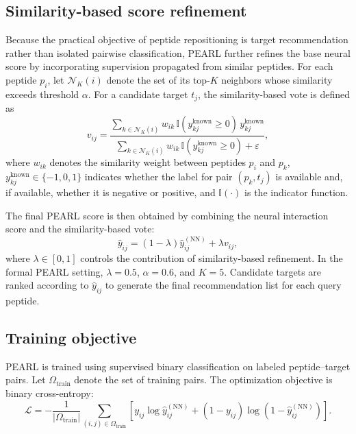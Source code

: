 \subsection{Similarity-based score refinement}

Because the practical objective of peptide repositioning is target recommendation rather than isolated pairwise classification, PEARL further refines the base neural score by incorporating supervision propagated from similar peptides. For each peptide $p_i$, let $\mathcal{N}_{K}(i)$ denote the set of its top-$K$ neighbors whose similarity exceeds threshold $\alpha$. For a candidate target $t_j$, the similarity-based vote is defined as
\begin{equation}
v_{ij}
=
\frac{
\sum\limits_{k \in \mathcal{N}_{K}(i)}
w_{ik} \,
\mathbb{I}(y_{kj}^{\mathrm{known}} \ge 0) \,
y_{kj}^{\mathrm{known}}
}{
\sum\limits_{k \in \mathcal{N}_{K}(i)}
w_{ik} \,
\mathbb{I}(y_{kj}^{\mathrm{known}} \ge 0)
+ \varepsilon
},
\end{equation}
where $w_{ik}$ denotes the similarity weight between peptides $p_i$ and $p_k$, $y_{kj}^{\mathrm{known}} \in \{-1,0,1\}$ indicates whether the label for pair $(p_k,t_j)$ is available and, if available, whether it is negative or positive, and $\mathbb{I}(\cdot)$ is the indicator function.

The final PEARL score is then obtained by combining the neural interaction score and the similarity-based vote:
\begin{equation}
\hat{y}_{ij}
=
(1-\lambda)\hat{y}_{ij}^{(\mathrm{NN})}
+ \lambda v_{ij},
\end{equation}
where $\lambda \in [0,1]$ controls the contribution of similarity-based refinement. In the formal PEARL setting, $\lambda = 0.5$, $\alpha = 0.6$, and $K = 5$. Candidate targets are ranked according to $\hat{y}_{ij}$ to generate the final recommendation list for each query peptide.

\subsection{Training objective}

PEARL is trained using supervised binary classification on labeled peptide--target pairs. Let $\Omega_{\mathrm{train}}$ denote the set of training pairs. The optimization objective is binary cross-entropy:
\begin{equation}
\mathcal{L}
=
-\frac{1}{|\Omega_{\mathrm{train}}|}
\sum_{(i,j)\in\Omega_{\mathrm{train}}}
\left[
y_{ij}\log \hat{y}_{ij}^{(\mathrm{NN})}
+ (1-y_{ij})\log \left(1-\hat{y}_{ij}^{(\mathrm{NN})}\right)
\right].
\end{equation}

